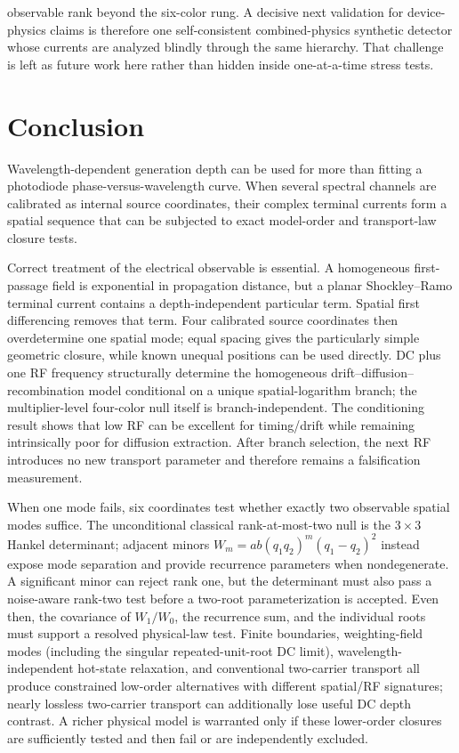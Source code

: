 \documentclass[11pt]{article}
\begin{document}
observable rank beyond the six-color rung. A decisive next validation for device-physics claims is therefore one self-consistent combined-physics synthetic detector whose currents are analyzed blindly through the same hierarchy. That challenge is left as future work here rather than hidden inside one-at-a-time stress tests.

\section{Conclusion}

Wavelength-dependent generation depth can be used for more than fitting a photodiode phase-versus-wavelength curve. When several spectral channels are calibrated as internal source coordinates, their complex terminal currents form a spatial sequence that can be subjected to exact model-order and transport-law closure tests.

Correct treatment of the electrical observable is essential. A homogeneous first-passage field is exponential in propagation distance, but a planar Shockley--Ramo terminal current contains a depth-independent particular term. Spatial first differencing removes that term. Four calibrated source coordinates then overdetermine one spatial mode; equal spacing gives the particularly simple geometric closure, while known unequal positions can be used directly. DC plus one RF frequency structurally determine the homogeneous drift--diffusion--recombination model conditional on a unique spatial-logarithm branch; the multiplier-level four-color null itself is branch-independent. The conditioning result shows that low RF can be excellent for timing/drift while remaining intrinsically poor for diffusion extraction. After branch selection, the next RF introduces no new transport parameter and therefore remains a falsification measurement.

When one mode fails, six coordinates test whether exactly two observable spatial modes suffice. The unconditional classical rank-at-most-two null is the $3\times3$ Hankel determinant; adjacent minors $W_m=ab(q_1q_2)^m(q_1-q_2)^2$ instead expose mode separation and provide recurrence parameters when nondegenerate. A significant minor can reject rank one, but the determinant must also pass a noise-aware rank-two test before a two-root parameterization is accepted. Even then, the covariance of $W_1/W_0$, the recurrence sum, and the individual roots must support a resolved physical-law test. Finite boundaries, weighting-field modes (including the singular repeated-unit-root DC limit), wavelength-independent hot-state relaxation, and conventional two-carrier transport all produce constrained low-order alternatives with different spatial/RF signatures; nearly lossless two-carrier transport can additionally lose useful DC depth contrast. A richer physical model is warranted only if these lower-order closures are sufficiently tested and then fail or are independently excluded.
\end{document}
